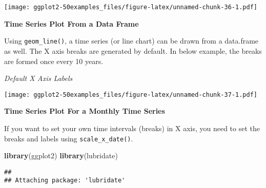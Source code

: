 \documentclass[a4paper]{article}
\newenvironment{Shaded}{\begin{snugshade}}{\end{snugshade}}
\newcommand{\KeywordTok}[1]{\textcolor[rgb]{0.13,0.29,0.53}{\textbf{#1}}}
\newcommand{\DataTypeTok}[1]{\textcolor[rgb]{0.13,0.29,0.53}{#1}}
\newcommand{\StringTok}[1]{\textcolor[rgb]{0.31,0.60,0.02}{#1}}
\newcommand{\CommentTok}[1]{\textcolor[rgb]{0.56,0.35,0.01}{\textit{#1}}}
\newcommand{\OperatorTok}[1]{\textcolor[rgb]{0.81,0.36,0.00}{\textbf{#1}}}
\newcommand{\NormalTok}[1]{#1}
\begin{document}
\texttt{[image: ggplot2-50examples\_files/figure-latex/unnamed-chunk-36-1.pdf]}

\newpage

\textbf{Time Series Plot From a Data Frame}

Using \texttt{geom\_line()}, a time series (or line chart) can be drawn
from a data.frame as well. The X axis breaks are generated by default.
In below example, the breaks are formed once every 10 years.

\emph{Default X Axis Labels}

\begin{Shaded}
\end{Shaded}

\texttt{[image: ggplot2-50examples\_files/figure-latex/unnamed-chunk-37-1.pdf]}

\newpage

\textbf{Time Series Plot For a Monthly Time Series}

If you want to set your own time intervals (breaks) in X axis, you need
to set the breaks and labels using \texttt{scale\_x\_date()}.

\begin{Shaded}
\begin{Highlighting}[]
\KeywordTok{library}\NormalTok{(ggplot2)}
\KeywordTok{library}\NormalTok{(lubridate)}
\end{Highlighting}
\end{Shaded}

\begin{verbatim}
## 
## Attaching package: 'lubridate'
\end{verbatim}
\end{document}

